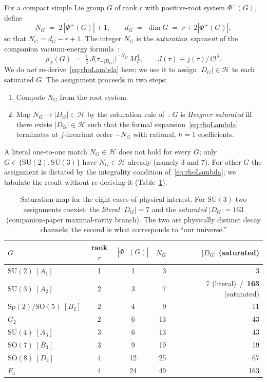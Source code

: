 \documentclass[11pt,a4paper]{article}
\theoremstyle{plain}
\theoremstyle{definition}
\newcommand{\Phip}{\Phi^{+}}
\newcommand{\SU}{\mathrm{SU}}
\newcommand{\SO}{\mathrm{SO}}
\newcommand{\Sp}{\mathrm{Sp}}
\begin{document}
For a compact simple Lie group $G$ of rank $r$ with positive-root system $\Phip(G)$, define
\begin{equation}\label{eq:NGdef}
N_G \;=\; 2\,|\Phip(G)|+1, \qquad d_G\;=\;\dim G\;=\;r+2|\Phip(G)|,
\end{equation}
so that $N_G = d_G-r+1$. The integer $N_G$ is the \emph{saturation exponent} of the companion vacuum-energy formula~\cite{Companion1}:
\begin{equation}\label{eq:rhoLambda}
\rho_\Lambda(G) \;=\; \tfrac{1}{4}\,J\bigl(\tau_{-|D_G|}\bigr)^{-N_G}\,M_P^4,
\qquad J(\tau)\equiv j(\tau)/12^3.
\end{equation}
We do \emph{not} re-derive~\eqref{eq:rhoLambda} here; we use it to assign $|D_G|\in\mathcal{H}$ to each saturated $G$. The assignment proceeds in two steps:
\begin{enumerate}
\item Compute $N_G$ from the root system.
\item Map $N_G\to|D_G|\in\mathcal{H}$ by the saturation rule of~\cite{Companion1}: $G$ is \emph{Heegner-saturated} iff there exists $|D_G|\in\mathcal{H}$ such that the formal expansion~\eqref{eq:rhoLambda} terminates at $j$-invariant order $-N_G$ with rational, $h{=}1$ coefficients.
\end{enumerate}
A literal one-to-one match $N_G\in\mathcal{H}$ does not hold for every $G$; only $G\in\{\SU(2),\SU(3)\}$ have $N_G\in\mathcal{H}$ already (namely $3$ and $7$). For other $G$ the assignment is dictated by the integrality condition of~\eqref{eq:rhoLambda}; we tabulate the result without re-deriving it (Table~\ref{tab:saturation}).

\begin{table}[ht]
\centering
\begin{tabular}{lccrr}
\toprule
$G$ & rank $r$ & $|\Phip(G)|$ & $N_G$ & $|D_G|$ (saturated) \\
\midrule
$\SU(2)\;[A_1]$ & 1 & 1 & 3 & 3 \\
$\SU(3)\;[A_2]$ & 2 & 3 & 7 & 7 (literal) \,/\, \textbf{163} (saturated) \\
$\Sp(2)/\SO(5)\;[B_2]$ & 2 & 4 & 9 & 11 \\
$G_2$ & 2 & 6 & 13 & 43 \\
$\SU(4)\;[A_3]$ & 3 & 6 & 13 & 43 \\
$\SO(7)\;[B_3]$ & 3 & 9 & 19 & 19 \\
$\SO(8)\;[D_4]$ & 4 & 12 & 25 & 67 \\
$F_4$ & 4 & 24 & 49 & 163 \\
\bottomrule
\end{tabular}
\caption{Saturation map for the eight cases of physical interest. For $\SU(3)$ two assignments coexist: the \emph{literal} $|D_G|=7$ and the \emph{saturated} $|D_G|=163$ (companion-paper maximal-rarity branch). The two are physically distinct decay channels; the second is what corresponds to ``our universe.''}
\label{tab:saturation}
\end{table}
\end{document}
